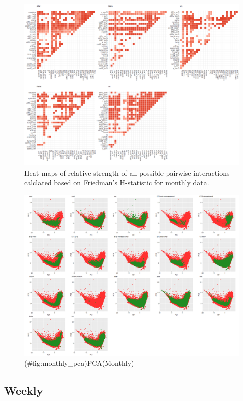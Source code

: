 \documentclass[11pt,a4paper,]{article}
\theoremstyle{definition}
\theoremstyle{definition}
\theoremstyle{definition}
\theoremstyle{remark}
\begin{document}
\begin{figure}
\centering
\includegraphics{figures/friedmanM2-1.png}
\caption{\label{fig:friedmanM2}Heat maps of relative strength of all
possible pairwise interactions calclated based on Friedman's H-statistic
for monthly data.}
\end{figure}

\newpage

\begin{figure}
\centering
\includegraphics{figures/monthly_pca-1.png}
\caption{(\#fig:monthly\_pca)PCA(Monthly)}
\end{figure}

\newpage

\subsection{Weekly}\label{weekly}
\end{document}
